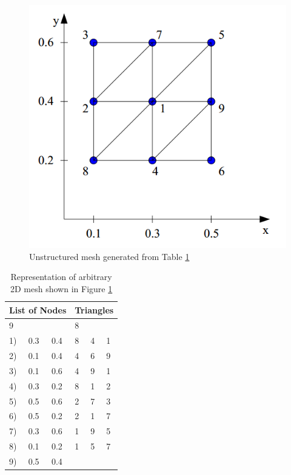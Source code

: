 \documentclass{article}
\begin{document}
\begin{figure}
	\centering
	\includegraphics[scale=0.4]{figures/unstructured-mesh-example.png}
	\caption{Unstructured mesh generated from Table \ref{tab:mesh-representation}}
	\label{fig:mesh-representation}
\end{figure}

\begin{table}
	\label{tab:mesh-representation}
	\centering
	\begin{tabular}{|l|l|l|l|l|l|}
		\hline
		\multicolumn{3}{|c|}{\textbf{List of Nodes}} & \multicolumn{3}{|c|}{\textbf{Triangles}} \\
		\hline
		\multicolumn{3}{|l|}{9} & \multicolumn{3}{|l|}{8} \\		
		\hline
		1) & 0.3 & 0.4 & 8 & 4 & 1 \\
		2) & 0.1 & 0.4 & 4 & 6 & 9 \\
		3) & 0.1 & 0.6 & 4 & 9 & 1 \\
		4) & 0.3 & 0.2 & 8 & 1 & 2 \\
		5) & 0.5 & 0.6 & 2 & 7 & 3 \\
		6) & 0.5 & 0.2 & 2 & 1 & 7 \\
		7) & 0.3 & 0.6 & 1 & 9 & 5 \\
		8) & 0.1 & 0.2 & 1 & 5 & 7 \\
		9) & 0.5 & 0.4 & & & \\
		\hline
	\end{tabular}
	\caption{Representation of arbitrary 2D mesh shown in Figure \ref{fig:mesh-representation}}
\end{table}
\end{document}
